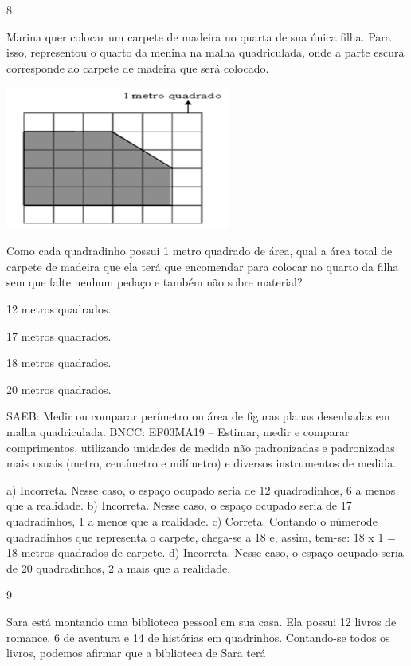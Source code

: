 {\begin{escolha}
{\num{8}

Marina quer colocar um carpete de madeira no quarta de sua única filha.
Para isso, representou o quarto da menina na malha quadriculada, onde a parte escura corresponde ao carpete de madeira que será
colocado.


\includegraphics[width=2.90385in,height=1.84662in]{media/image123.png}

Como cada quadradinho possui 1 metro quadrado de área, qual a área total de carpete de madeira que ela terá que encomendar para colocar no quarto da filha sem que falte nenhum pedaço e também não sobre material?

\begin{escolha}
\item
  12 metros quadrados.
\item
  17 metros quadrados.
\item
  18 metros quadrados.
\item
  20 metros quadrados.
\end{escolha}

SAEB: Medir ou comparar perímetro ou área de figuras planas desenhadas em malha quadriculada.
BNCC: EF03MA19 -- Estimar, medir e comparar comprimentos, utilizando unidades de medida
não padronizadas e padronizadas mais usuais (metro, centímetro e milímetro) e diversos
instrumentos de medida.

a) Incorreta. Nesse caso, o espaço ocupado seria de 12 quadradinhos, 6 a menos que a realidade.
b) Incorreta. Nesse caso, o espaço ocupado seria de 17 quadradinhos, 1 a menos que a realidade.
c) Correta. Contando o númerode quadradinhos que representa o carpete, chega-se a 18 e,
assim, tem-se: 18 x 1 = 18 metros quadrados de carpete.
d) Incorreta. Nesse caso, o espaço ocupado seria de 20 quadradinhos, 2 a mais que a realidade.

\num{9}

Sara está montando uma biblioteca pessoal em sua casa. Ela possui 12 livros de romance, 6 de aventura e 14 de histórias em quadrinhos. Contando-se todos os livros, podemos afirmar que a biblioteca de Sara terá

}
\end{escolha}}
